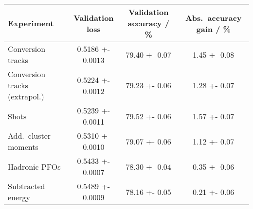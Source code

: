 \begin{tabular}{lS[table-format=1.4(4)]S[table-format=2.2(2)]S[table-format=1.2(2)]}
  \toprule
  {Experiment} & {Validation loss} & {Validation accuracy / \si{\percent}} & {Abs.\ accuracy gain / \si{\percent}} \\
  \midrule
  Conversion tracks & 0.5186 +- 0.0013 & 79.40 +- 0.07 & 1.45 +- 0.08 \\
  Conversion tracks (extrapol.) & 0.5224 +- 0.0012 & 79.23 +- 0.06 & 1.28 +- 0.07 \\
  Shots & 0.5239 +- 0.0011 & 79.52 +- 0.06 &  1.57 +- 0.07 \\
  Add.\ cluster moments & 0.5310 +- 0.0010 & 79.07 +- 0.06 & 1.12 +- 0.07 \\
  Hadronic PFOs & 0.5433 +- 0.0007 & 78.30 +- 0.04 & 0.35 +- 0.06 \\
  Subtracted energy & 0.5489 +- 0.0009 & 78.16 +- 0.05 & 0.21 +- 0.06 \\
  \bottomrule
\end{tabular}

